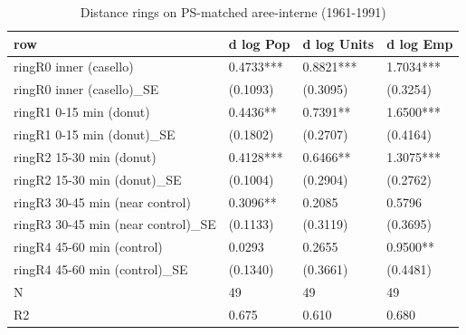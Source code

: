 \begin{table}

\caption{Distance rings on PS-matched aree-interne (1961-1991)}
\centering
\begin{tabular}[t]{llll}
\toprule
row & d log Pop & d log Units & d log Emp\\
\midrule
ringR0 inner (casello) & 0.4733*** & 0.8821*** & 1.7034***\\
ringR0 inner (casello)\_SE & (0.1093) & (0.3095) & (0.3254)\\
ringR1 0-15 min (donut) & 0.4436** & 0.7391** & 1.6500***\\
ringR1 0-15 min (donut)\_SE & (0.1802) & (0.2707) & (0.4164)\\
ringR2 15-30 min (donut) & 0.4128*** & 0.6466** & 1.3075***\\
\addlinespace
ringR2 15-30 min (donut)\_SE & (0.1004) & (0.2904) & (0.2762)\\
ringR3 30-45 min (near control) & 0.3096** & 0.2085 & 0.5796\\
ringR3 30-45 min (near control)\_SE & (0.1133) & (0.3119) & (0.3695)\\
ringR4 45-60 min (control) & 0.0293 & 0.2655 & 0.9500**\\
ringR4 45-60 min (control)\_SE & (0.1340) & (0.3661) & (0.4481)\\
\addlinespace
N & 49 & 49 & 49\\
R2 & 0.675 & 0.610 & 0.680\\
\bottomrule
\end{tabular}
\end{table}

